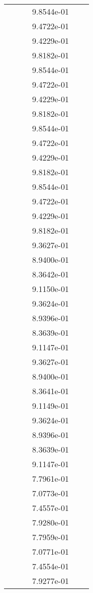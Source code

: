 \begin{xltabular}{\textwidth}{r|rS[table-format=1.3e+2]S[table-format=1.4e+2]S[table-format=1.4e+2]S[table-format=-1.5]}
&  &  & 9.8544e-01 & & \\
&  &  & 9.4722e-01 & & \\
&  &  & 9.4229e-01 & & \\
&  &  & 9.8182e-01 & & \\
&  &  & 9.8544e-01 & & \\
&  &  & 9.4722e-01 & & \\
&  &  & 9.4229e-01 & & \\
&  &  & 9.8182e-01 & & \\
&  &  & 9.8544e-01 & & \\
&  &  & 9.4722e-01 & & \\
&  &  & 9.4229e-01 & & \\
&  &  & 9.8182e-01 & & \\
&  &  & 9.8544e-01 & & \\
&  &  & 9.4722e-01 & & \\
&  &  & 9.4229e-01 & & \\
&  &  & 9.8182e-01 & & \\
&  &  & 9.3627e-01 & & \\
&  &  & 8.9400e-01 & & \\
&  &  & 8.3642e-01 & & \\
&  &  & 9.1150e-01 & & \\
&  &  & 9.3624e-01 & & \\
&  &  & 8.9396e-01 & & \\
&  &  & 8.3639e-01 & & \\
&  &  & 9.1147e-01 & & \\
&  &  & 9.3627e-01 & & \\
&  &  & 8.9400e-01 & & \\
&  &  & 8.3641e-01 & & \\
&  &  & 9.1149e-01 & & \\
&  &  & 9.3624e-01 & & \\
&  &  & 8.9396e-01 & & \\
&  &  & 8.3639e-01 & & \\
&  &  & 9.1147e-01 & & \\
&  &  & 7.7961e-01 & & \\
&  &  & 7.0773e-01 & & \\
&  &  & 7.4557e-01 & & \\
&  &  & 7.9280e-01 & & \\
&  &  & 7.7959e-01 & & \\
&  &  & 7.0771e-01 & & \\
&  &  & 7.4554e-01 & & \\
&  &  & 7.9277e-01 & & \\

\end{xltabular}
